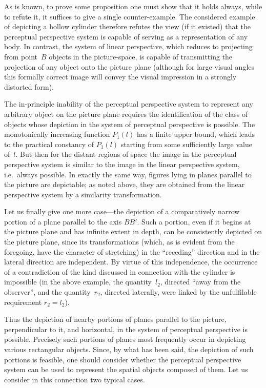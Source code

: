 As is known, to prove some proposition one must show that it holds always, while to refute
it, it suffices to give a single counter-example.  The considered example of depicting a
hollow cylinder therefore refutes the view (if it existed) that the perceptual perspective
system is capable of serving as a representation of any body.  In contrast, the system of
linear perspective, which reduces to projecting from point~$B$ objects in the picture-space,
is capable of transmitting the projection of any object onto the picture plane (although for
large visual angles this formally correct image will convey the visual impression in a
strongly distorted form).

The in-principle inability of the perceptual perspective system to represent any arbitrary
object on the picture plane requires the identification of the class of objects whose
depiction in the system of perceptual perspective is possible.  The monotonically increasing
function $P_1(l)$ has a finite upper bound, which leads to the practical constancy of $P_1(l)$
starting from some sufficiently large value of~$l$.  But then for the distant regions of space
the image in the perceptual perspective system is similar to the image in the linear
perspective system, i.e.\ always possible.  In exactly the same way, figures lying in planes
parallel to the picture are depictable; as noted above, they are obtained from the linear
perspective system by a similarity transformation.

Let us finally give one more case---the depiction of a comparatively narrow portion of a
plane parallel to the axis $BB'$.  Such a portion, even if it begins at the picture plane and
has infinite extent in depth, can be consistently depicted on the picture plane, since its
transformations (which, as is evident from the foregoing, have the character of stretching)
in the ``receding'' direction and in the lateral direction are independent.  By virtue of this
independence, the occurrence of a contradiction of the kind discussed in connection with the
cylinder is impossible (in the above example, the quantity~$l_2$, directed ``away from the
observer'', and the quantity~$r_2$, directed laterally, were linked by the unfulfilable
requirement $r_2 = l_2$).


Thus the depiction of nearby portions of planes parallel to the picture, perpendicular to it,
and horizontal, in the system of perceptual perspective is possible.  Precisely such portions
of planes most frequently occur in depicting various rectangular objects.  Since, by what has
been said, the depiction of such portions is feasible, one should consider whether the
perceptual perspective system can be used to represent the spatial objects composed of them.
Let us consider in this connection two typical cases.

